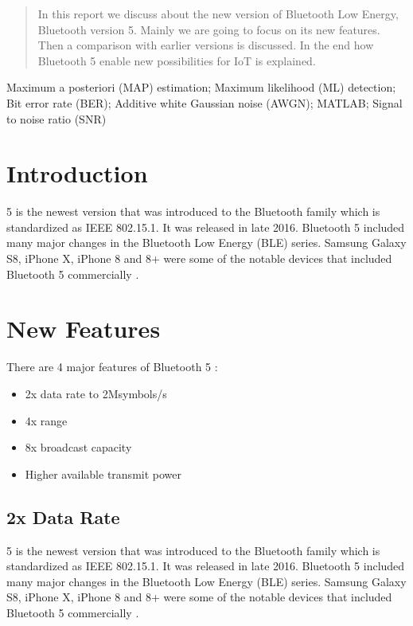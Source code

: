 \documentclass[journal, a4paper]{IEEEtran}
\begin{document}
\maketitle
    

\begin{abstract}
	In this report we discuss about the new version of Bluetooth Low Energy, Bluetooth version 5. Mainly we are going to focus on its new features. Then a comparison with earlier versions is discussed. In the end how Bluetooth 5 enable new possibilities for IoT is explained.
\end{abstract}

\begin{IEEEkeywords}
Maximum a posteriori (MAP) estimation; Maximum likelihood (ML) detection; Bit error rate (BER); Additive white Gaussian noise (AWGN); MATLAB; Signal to noise ratio (SNR)
\end{IEEEkeywords}


\section{Introduction}

	 5 is the newest version that was introduced to the Bluetooth family which is standardized as IEEE 802.15.1. It was released in late 2016. Bluetooth 5 included many major changes in the Bluetooth Low Energy (BLE) series. Samsung Galaxy S8, iPhone X, iPhone 8 and 8+ were some of the notable devices that included Bluetooth 5 commercially \cite{WIKI}. 
	
\section{New Features}

There are 4 major features of Bluetooth 5 \cite{SCHULZ}:

\begin{itemize}
\item 2x data rate to 2Msymbols/s 
\item 4x range
\item 8x broadcast capacity
\item Higher available transmit power
\end{itemize}

\subsection{2x Data Rate}

5 is the newest version that was introduced to the Bluetooth family which is standardized as IEEE 802.15.1. It was released in late 2016. Bluetooth 5 included many major changes in the Bluetooth Low Energy (BLE) series. Samsung Galaxy S8, iPhone X, iPhone 8 and 8+ were some of the notable devices that included Bluetooth 5 commercially \cite{WIKI}. 
\end{document}
